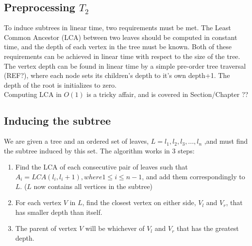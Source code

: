 \subsection{Preprocessing $T_2$}
To induce subtrees in linear time, two requirements must be met. The Least Common Ancestor (LCA) between two leaves should be computed in constant time, and the depth of each vertex in the tree must be known. Both of these requirements can be achieved in linear time with respect to the size of the tree. 
\\
The vertex depth can be found in linear time by a simple pre-order tree traversal (REF?), where each node sets its children's depth to it's own depth+1. The depth of the root is initializes to zero.  
\\
Computing LCA in $O(1)$ is a tricky affair, and is covered in Section/Chapter ??

\subsection{Inducing the subtree}
We are given a tree and an ordered set of leaves, $L=l_1,l_2,l_3,...,l_n$ ,and must find the subtree induced by this set. The algorithm works in 3 steps:
\begin{enumerate}
	\item Find the LCA of each consecutive pair of leaves such that $A_i=LCA(l_i,l_i+1), where 1 \le i \le n-1$, and add them correspondingly to $L$. ($L$ now contains all vertices in the subtree)
	\item For each vertex $V$ in $L$, find the closest vertex on either side, $V_l$ and $V_r$, that has smaller depth than itself.
	\item The parent of vertex $V$ will be whichever of $V_l$ and $V_r$ that has the greatest depth.
\end{enumerate}

